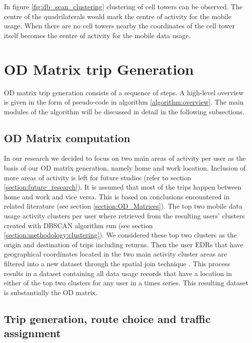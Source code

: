 \documentclass[12pt, a4paper]{report}
\theoremstyle{definition}
\theoremstyle{definition}%
\theoremstyle{definition}%
\theoremstyle{definition}%
\theoremstyle{definition}%
\theoremstyle{definition}%
\begin{document}
In figure \ref{fig:db_scan_clustering} clustering of cell towers can be observed. The centre of the quadrilaterals would mark the centre of activity for the mobile usage. When there are no cell towers nearby the coordinates of the cell tower itself becomes the centre of activity for the mobile data usage. 



\section{OD Matrix trip Generation}  \label{section:odmatrix_trip_generation}

OD matrix trip generation consists of a sequence of steps. A high-level overview is given in the form of pseudo-code in algorithm \ref{algorithm:overview}. The main modules of the algorithm will be discussed in detail in the following subsections.
 
\subsection{OD Matrix computation}   \label{subsection:odmatrix_computation}
In our research we decided to focus on two main areas of activity per user as the basis of our OD matrix generation, namely home and work location. Inclusion of more areas of activity is left for future studies (refer to section \ref{section:future_research}). It is assumed that most of the trips happen between home and work and vice versa. This is based on conclusions encountered in related literature (see section \ref{section:OD_Matrices}). 
The top two mobile data usage activity clusters per user where retrieved from the resulting users' clusters created with DBSCAN algorithm run (see section \ref{section:methodology:clustering}). We considered these top two clusters as the origin and destination of trips including returns. Then the user EDRs that have geographical coordinates located in the two main activity cluster areas are filtered into a new dataset through the spatial join technique \cite{eldawy2015spatialhadoop}. This process results in a dataset containing all data usage records that have a location in either of the top two clusters for any user in a times series. This resulting dataset is substantially the OD matrix.


\subsection{Trip generation, route choice and traffic assignment} \label{subsection:trip_generation}
\end{document}
